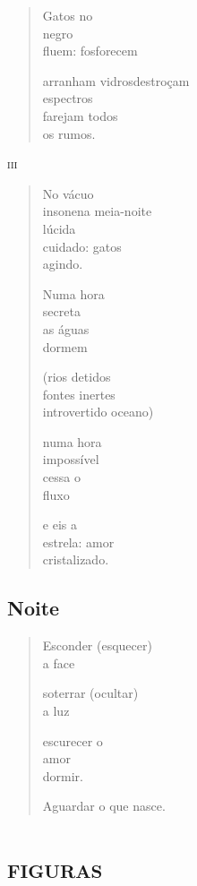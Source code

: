 \begin{verse}
Gatos no\\
negro\\
fluem: fosforecem

arranham vidros\qquad\quad destroçam\\
espectros\\
farejam todos\\
os rumos.
\end{verse}

\medskip
\textsc{iii}

\begin{verse}
No vácuo\\
insone\quad\qquad na meia-noite\\
lúcida\\
cuidado: gatos\\
agindo.

Numa hora\\
secreta\\
as águas\\
dormem

(rios detidos\\
\quad fontes inertes\\
\qquad introvertido oceano)

numa hora\\
impossível\\
cessa o\\
\qquad\quad fluxo

e eis a\\
estrela: amor\\
cristalizado.
\end{verse}

\chapter{Noite}

\begin{verse}
Esconder (esquecer)\\
a face

soterrar (ocultar)\\
a luz

escurecer o\\
amor\\
dormir.

Aguardar o que nasce.
\end{verse}

\part*{\textsc{figuras}}

